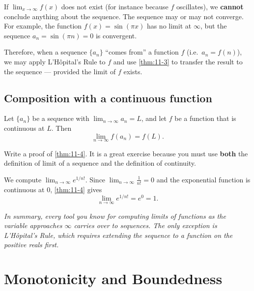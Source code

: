 \begin{remark}[Warning]
If $\lim_{x\to\infty}f(x)$ does not exist (for instance because $f$ oscillates), we \textbf{cannot} conclude anything about the sequence.  The sequence may or may not converge.  For example, the function $f(x)=\sin(\pi x)$ has no limit at $\infty$, but the sequence $a_{n}=\sin(\pi n)=0$ is convergent.
\end{remark}

Therefore, when a sequence $\{a_{n}\}$ ``comes from'' a function $f$ (i.e.\ $a_{n}=f(n)$), we may apply L'H\^opital's Rule to $f$ and use \cref{thm:11-3} to transfer the result to the sequence --- provided the limit of $f$ exists.

\subsection*{Composition with a continuous function}

\begin{theorem}
\label{thm:11-4}
Let $\{a_{n}\}$ be a sequence with $\lim_{n\to\infty}a_{n}=L$, and let $f$ be a function that is continuous at $L$.  Then
\[
  \lim_{n\to\infty}f(a_{n})=f(L).
\]
\end{theorem}

\begin{remark}
Write a proof of \cref{thm:11-4}.  It is a great exercise because you must use \textbf{both} the definition of limit of a sequence and the definition of continuity.
\end{remark}

\begin{example}
\label{ex:11-2}
We compute $\lim_{n\to\infty}e^{1/n!}$.  Since $\lim_{n\to\infty}\frac{1}{n!}=0$ and the exponential function is continuous at $0$, \cref{thm:11-4} gives
\[
  \lim_{n\to\infty}e^{1/n!}=e^{0}=1.
\]
\end{example}

\textit{In summary, every tool you know for computing limits of functions as the variable approaches $\infty$ carries over to sequences.  The only exception is L'H\^opital's Rule, which requires extending the sequence to a function on the positive reals first.}

\section{Monotonicity and Boundedness}
\label{sec:11.4}


